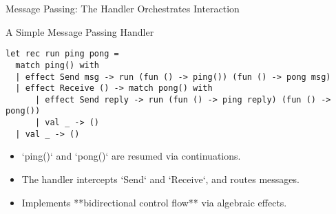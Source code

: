 \begin{frame}[fragile]{Message Passing: The Handler Orchestrates Interaction}
\vspace{-0.5em}
\begin{block}{\scriptsize A Simple Message Passing Handler}
\begin{scriptsize}
\begin{verbatim}
let rec run ping pong =
  match ping() with
  | effect Send msg -> run (fun () -> ping()) (fun () -> pong msg)
  | effect Receive () -> match pong() with
      | effect Send reply -> run (fun () -> ping reply) (fun () -> pong())
      | val _ -> ()
  | val _ -> ()
\end{verbatim}
\end{scriptsize}
\end{block}

\vspace{0.3em}
\begin{itemize}
  \item `ping()` and `pong()` are resumed via continuations.
  \item The handler intercepts `Send` and `Receive`, and routes messages.
  \item Implements **bidirectional control flow** via algebraic effects.
\end{itemize}
\end{frame}